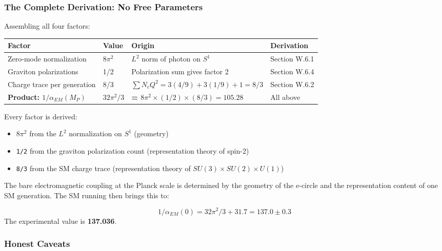 \documentclass[aps,prd,preprint,superscriptaddress,longbibliography,floatfix]{revtex4-2}
\theoremstyle{remark}
\begin{document}
\subsubsection{The Complete Derivation: No Free Parameters}

Assembling all four factors:


\begin{table}[H]
\begin{ruledtabular}
\begin{tabular}{p{3.8cm}p{3.8cm}p{3.8cm}p{3.8cm}}
Factor & Value & Origin & Derivation \\
\hline
Zero-mode normalization & $8\pi^{2}$ & $L^{2}$ norm of photon on $S^{1}$ & Section W.6.1 \\
Graviton polarizations & 1/2 & Polarization sum gives factor 2 & Section W.6.4 \\
Charge trace per generation & 8/3 & $\sum N_c Q^{2} = 3(4/9) + 3(1/9) + 1 = 8/3$ & Section W.6.2 \\
\textbf{Product: $1/\alpha_{EM}(M_P)$} & \textbf{$32\pi^{2}/3$} & \textbf{= $8\pi^{2} \times (1/2) \times (8/3) = 105.28$} & All above \\
\end{tabular}
\end{ruledtabular}
\end{table}

Every factor is derived:

\begin{itemize}
  \item $8\pi^{2}$ from the $L^{2}$ normalization on $S^{1}$ (geometry)
  \item \texttt{1/2} from the graviton polarization count (representation theory of spin-2)
  \item \texttt{8/3} from the SM charge trace (representation theory of $SU(3) \times SU(2) \times U(1)$)
\end{itemize}

The bare electromagnetic coupling at the Planck scale is determined by the geometry of the e-circle and the representation content of one SM generation. The SM running then brings this to:


\begin{equation}
    1/\alpha_{EM}(0) = 32\pi^{2}/3 + 31.7 = 137.0 \pm 0.3
\end{equation}
The experimental value is \textbf{137.036}.


\subsubsection{Honest Caveats}
\end{document}
